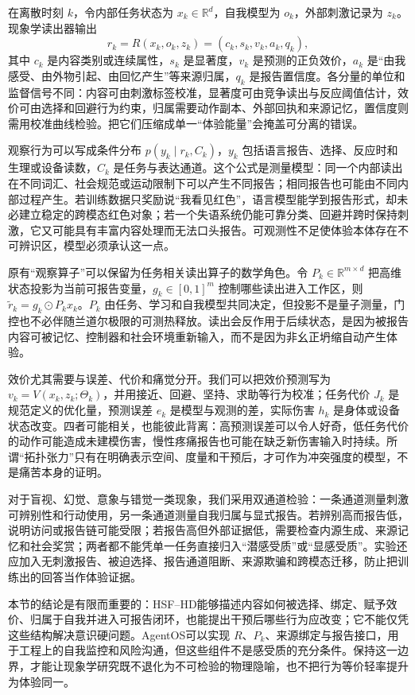 在离散时刻 $k$，令内部任务状态为 $x_k\in\mathbb R^d$，自我模型为 $o_k$，外部刺激记录为 $z_k$。现象学读出器输出
\[
r_k=R(x_k,o_k,z_k)=
(c_k,s_k,v_k,a_k,q_k),
\]
其中 $c_k$ 是内容类别或连续属性，$s_k$ 是显著度，$v_k$ 是预测的正负效价，$a_k$ 是“由我感受、由外物引起、由回忆产生”等来源归属，$q_k$ 是报告置信度。各分量的单位和监督信号不同：内容可由刺激标签校准，显著度可由竞争读出与反应阈值估计，效价可由选择和回避行为约束，归属需要动作副本、外部回执和来源记忆，置信度则需用校准曲线检验。把它们压缩成单一“体验能量”会掩盖可分离的错误。

观察行为可以写成条件分布 $p(y_k\mid r_k,C_k)$，$y_k$ 包括语言报告、选择、反应时和生理或设备读数，$C_k$ 是任务与表达通道。这个公式是测量模型：同一个内部读出在不同词汇、社会规范或运动限制下可以产生不同报告；相同报告也可能由不同内部过程产生。若训练数据只奖励说“我看见红色”，语言模型能学到报告形式，却未必建立稳定的跨模态红色对象；若一个失语系统仍能可靠分类、回避并跨时保持刺激，它又可能具有丰富内容处理而无法口头报告。可观测性不足使体验本体存在不可辨识区，模型必须承认这一点。

原有“观察算子”可以保留为任务相关读出算子的数学角色。令 $P_k\in\mathbb R^{m\times d}$ 把高维状态投影为当前可报告变量，$g_k\in[0,1]^m$ 控制哪些读出进入工作区，则 $\tilde r_k=g_k\odot P_kx_k$。$P_k$ 由任务、学习和自我模型共同决定，但投影不是量子测量，门控也不必伴随兰道尔极限的可测热释放。读出会反作用于后续状态，是因为被报告内容可被记忆、控制器和社会环境重新输入，而不是因为非幺正坍缩自动产生体验。

效价尤其需要与误差、代价和痛觉分开。我们可以把效价预测写为 $v_k=V(x_k,z_k;\Theta_k)$，并用接近、回避、坚持、求助等行为校准；任务代价 $J_k$ 是规范定义的优化量，预测误差 $e_k$ 是模型与观测的差，实际伤害 $h_k$ 是身体或设备状态改变。四者可能相关，也能彼此背离：高预测误差可以令人好奇，低任务代价的动作可能造成未建模伤害，慢性疼痛报告也可能在缺乏新伤害输入时持续。所谓“拓扑张力”只有在明确表示空间、度量和干预后，才可作为冲突强度的模型，不是痛苦本身的证明。

对于盲视、幻觉、意象与错觉一类现象，我们采用双通道检验：一条通道测量刺激可辨别性和行动使用，另一条通道测量自我归属与显式报告。若辨别高而报告低，说明访问或报告链可能受限；若报告高但外部证据低，需要检查内源生成、来源记忆和社会奖赏；两者都不能凭单一任务直接归入“潜感受质”或“显感受质”。实验还应加入无刺激报告、被迫选择、报告通道阻断、来源欺骗和跨模态迁移，防止把训练出的回答当作体验证据。

本节的结论是有限而重要的：HSF--HD能够描述内容如何被选择、绑定、赋予效价、归属于自我并进入可报告闭环，也能提出干预后哪些行为应改变；它不能仅凭这些结构解决意识硬问题。AgentOS可以实现 $R$、$P_k$、来源绑定与报告接口，用于工程上的自我监控和风险沟通，但这些组件不是感受质的充分条件。保持这一边界，才能让现象学研究既不退化为不可检验的物理隐喻，也不把行为等价轻率提升为体验同一。

